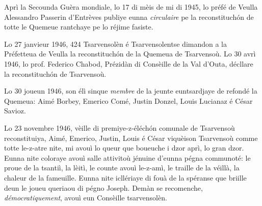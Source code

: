 




\DramPer


Aprì la Secounda Guèra mondiale, lo 17 di mèis de mi di 1945, lo préfé de Veulla Alessandro Passerin d'Entrèves publiye eunna \textit{circulaire} pe la reconstituch\'on de totte le Quemeue ran\-tchaye pe lo réjime fasiste.

Lo 27 janvieur 1946, 424 Tsarvensolèn é Tsarvensolentse dimandon a la Préfetteua de Veulla la reconstituch\'on de la Quemeua de Tsarvensoù. Lo 30 avrì 1946, lo prof. Federico Chabod, Prézidàn di Consèille de la Val d'Outa, décllare la reconstituch\'on de Tsarvensoù.

Lo 30 joueun 1946, son élì sinque \textit{membre} de la jeunte eun\-tsardjaye de refondé la Quemeua: Aimé Borbey, Emerico Comé, Justin Donzel, Louis Lucianaz é César Savioz.

Lo 23 novembre 1946, vèille di premiye-z-éléch\'on comunale de Tsarvensoù reconstituiya, Aimé, Emerico, Justin, Louis é César viquèison Tsarvensoù comme totte le-z-atre nite, mi avouì lo queur que  boueuche i dzor aprì, lo gran dzor. Eunna nite coloraye avouì salle attivitoù jénuine d'eunna pégna communoté: le proue de la tsantiì, la lèitì, le counte avouì le-z-amì, le traille de la véillà, la chaleur de la fameuille. Eunna nite icllériaye di fouà de la spéranse que briille deun le joueu  queriaou di pégno Joseph. Demàn se recomenche, \textit{démocratiquement}, avouì eun Consèille tsarvensolèn.

\DeriLeRido
{}
